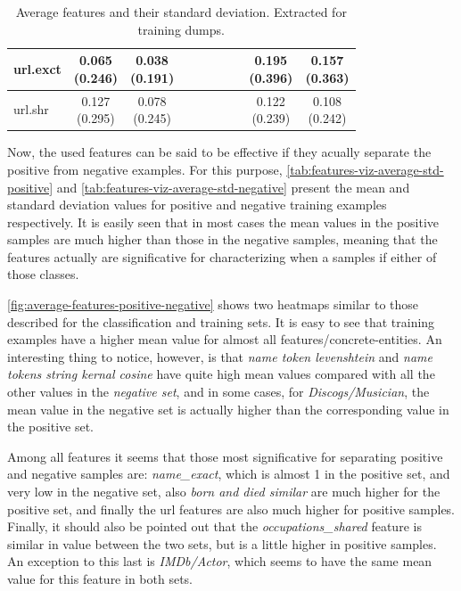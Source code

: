 \documentclass[epsfig,a4paper,11pt,titlepage,twoside,openany]{book}
\begin{document}
\begin{table}[h]
\begin{tabular}{l|c|c|c|c|c|c|c|c|c|}
\multicolumn{1}{|l|}{url.exct}                           & \makecell{0.065 \\ (0.246)}  & \makecell{0.038 \\ (0.191)} &              &              &              &              &              & \makecell{0.195 \\ (0.396)}    & \makecell{0.157 \\ (0.363)}   \\ \hline
\multicolumn{1}{|l|}{url.shr}                  & \makecell{0.127 \\ (0.295)}  & \makecell{0.078 \\ (0.245)} &              &              &              &              &              & \makecell{0.122 \\ (0.239)}    & \makecell{0.108 \\ (0.242)}   \\ \hline
\end{tabular}
\caption{Average features and their standard deviation. Extracted for training dumps.}
\label{tab:features-viz-average-std-training}
\end{table}


Now, the used features can be said to be effective if they acually separate the positive from negative examples. For this purpose, \autoref{tab:features-viz-average-std-positive} and \autoref{tab:features-viz-average-std-negative} present the mean and standard deviation values for positive and negative training examples respectively. It is easily seen that in most cases the mean values in the positive samples are much higher than those in the negative samples, meaning that the features actually are significative for characterizing when a samples if either of those classes.

\autoref{fig:average-features-positive-negative} shows two heatmaps similar to those described for the classification and training sets. It is easy to see that training examples have a higher mean value for almost all features/concrete-entities. An interesting thing to notice, however, is that \textit{name token levenshtein} and \textit{name tokens string kernal cosine} have quite high mean values compared with all the other values in the \textit{negative set}, and in some cases, for \textit{Discogs/Musician}, the mean value in the negative set is actually higher than the corresponding value in the positive set. 

Among all features it seems that those most significative for separating positive and negative samples are: \textit{name\_exact}, which is almost 1 in the positive set, and very low in the negative set, also \textit{born and died similar} are much higher for the positive set, and finally the url features are also much higher for positive samples. Finally, it should also be pointed out that the \textit{occupations\_shared} feature is similar in value between the two sets, but is a little higher in positive samples. An exception to this last is \textit{IMDb/Actor}, which seems to have the same mean value for this feature in both sets.
\end{document}
